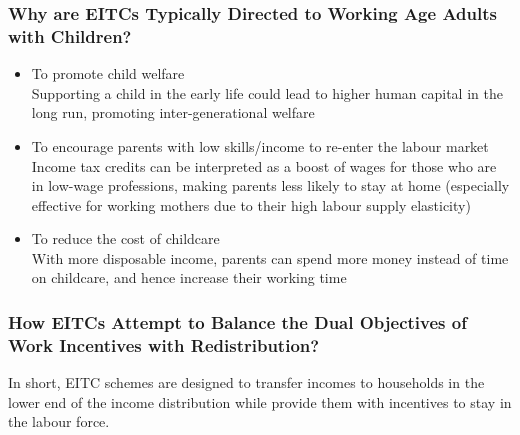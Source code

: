         \subsubsection{Why are EITCs Typically Directed to Working Age Adults with Children?}

            \begin{itemize}
                \item To promote child welfare\\
                Supporting a child in the early life could lead to higher human capital in the long run, promoting inter-generational welfare
                \item To encourage parents with low skills/income to re-enter the labour market\\
                Income tax credits can be interpreted as a boost of wages for those who are in low-wage professions, making parents less likely to stay at home (especially effective for working mothers due to their high labour supply elasticity)
                \item To reduce the cost of childcare\\
                With more disposable income, parents can spend more money instead of time on childcare, and hence increase their working time
            \end{itemize}

        \subsubsection{How EITCs Attempt to Balance the Dual Objectives of Work Incentives with Redistribution?}

            In short, EITC schemes are designed to transfer incomes to households in the lower end of the income distribution while provide them with incentives to stay in the labour force.

